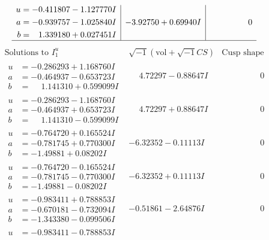 \documentclass[1p]{elsarticle_modified}
\theoremstyle{definition}
\newcommand{\I}{\sqrt{-1}}
\begin{document}
$$\begin{array}{c|c|c}
\begin{aligned}
u &= -0.411807 - 1.127770 I \\
a &= -0.939757 - 1.025840 I \\
b &= \phantom{-}1.339180 + 0.027451 I\end{aligned}
 & -3.92750 + 0.69940 I & \phantom{-0.000000 } 0\\
 \hline 
 \end{array}$$\newpage$$\begin{array}{c|c|c}  
\text{Solutions to }I^u_{1}& \I (\text{vol} + \sqrt{-1}CS) & \text{Cusp shape}\\
 \hline 
\begin{aligned}
u &= -0.286293 + 1.168760 I \\
a &= -0.464937 - 0.653723 I \\
b &= \phantom{-}1.141310 + 0.599099 I\end{aligned}
 & \phantom{-}4.72297 - 0.88647 I & \phantom{-0.000000 } 0 \\ \hline\begin{aligned}
u &= -0.286293 - 1.168760 I \\
a &= -0.464937 + 0.653723 I \\
b &= \phantom{-}1.141310 - 0.599099 I\end{aligned}
 & \phantom{-}4.72297 + 0.88647 I & \phantom{-0.000000 } 0 \\ \hline\begin{aligned}
u &= -0.764720 + 0.165524 I \\
a &= -0.781745 + 0.770300 I \\
b &= -1.49881 + 0.08202 I\end{aligned}
 & -6.32352 - 0.11113 I & \phantom{-0.000000 } 0 \\ \hline\begin{aligned}
u &= -0.764720 - 0.165524 I \\
a &= -0.781745 - 0.770300 I \\
b &= -1.49881 - 0.08202 I\end{aligned}
 & -6.32352 + 0.11113 I & \phantom{-0.000000 } 0 \\ \hline\begin{aligned}
u &= -0.983411 + 0.788853 I \\
a &= -0.670181 - 0.732094 I \\
b &= -1.343380 - 0.099506 I\end{aligned}
 & -0.51861 - 2.64876 I & \phantom{-0.000000 } 0 \\ \hline\begin{aligned}
u &= -0.983411 - 0.788853 I \\

\end{aligned}
\end{array}$$
\end{document}
